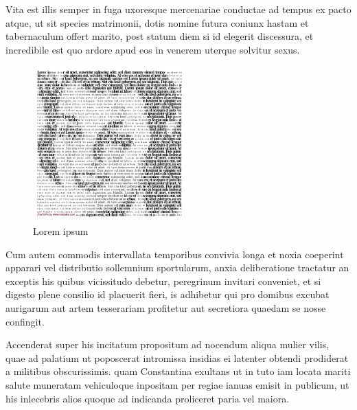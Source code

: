 \documentclass[a4paper]{article}
\begin{document}
{Vita est illis semper in fuga uxoresque mercenariae conductae ad tempus ex pacto atque, ut sit species matrimonii, dotis nomine futura coniunx hastam et tabernaculum offert marito, post statum diem si id elegerit discessura, et incredibile est quo ardore apud eos in venerem uterque solvitur sexus.

\begin{figure}[htbp]
  \begin{center}
    \includegraphics[width=.98\textwidth]{index.jpeg}
  \end{center}
  \caption{Lorem ipsum}
  \label{fig:5}
\end{figure}

Cum autem commodis intervallata temporibus convivia longa et noxia coeperint apparari vel distributio sollemnium sportularum, anxia deliberatione tractatur an exceptis his quibus vicissitudo debetur, peregrinum invitari conveniet, et si digesto plene consilio id placuerit fieri, is adhibetur qui pro domibus excubat aurigarum aut artem tesserariam profitetur aut secretiora quaedam se nosse confingit.

Accenderat super his incitatum propositum ad nocendum aliqua mulier vilis, quae ad palatium ut poposcerat intromissa insidias ei latenter obtendi prodiderat a militibus obscurissimis. quam Constantina exultans ut in tuto iam locata mariti salute muneratam vehiculoque inpositam per regiae ianuas emisit in publicum, ut his inlecebris alios quoque ad indicanda proliceret paria vel maiora.

}
\end{document}
